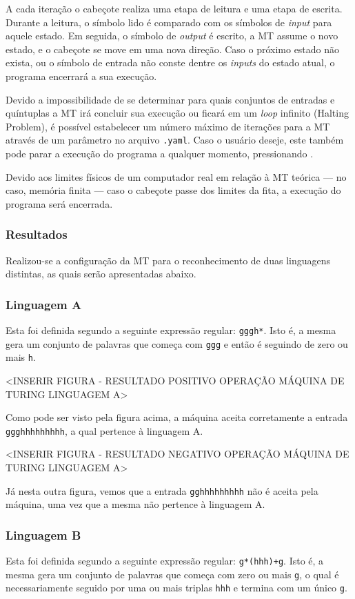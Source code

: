 \documentclass[12pt,fleqn]{article}
\begin{document}
A cada iteração o cabeçote realiza uma etapa de leitura e uma etapa de escrita.
Durante a leitura, o símbolo lido é comparado com os símbolos de \textit{input}
para aquele estado. Em seguida, o símbolo de \textit{output} é escrito, a MT
assume o novo estado, e o cabeçote se move em uma nova direção. Caso o próximo
estado não exista, ou o símbolo de entrada não conste dentre os \textit{inputs}
do estado atual, o programa encerrará a sua execução.

Devido a impossibilidade de se determinar para quais conjuntos de entradas e
quíntuplas a MT irá concluir sua execução ou ficará em um \textit{loop} infinito
(Halting Problem), é possível estabelecer um número máximo de iterações para a
MT através de um parâmetro no arquivo \verb|.yaml|. Caso o usuário deseje, este
também pode parar a execução do programa a qualquer momento, pressionando
.

Devido aos limites físicos de um computador real em relação à MT teórica --- no
caso, memória finita --- caso o cabeçote passe dos limites da fita, a execução
do programa será encerrada.

\subsubsection{Resultados}
Realizou-se a configuração da MT para o reconhecimento de duas linguagens
distintas, as quais serão apresentadas abaixo.

\subsubsection{Linguagem A}
Esta foi definida segundo a seguinte expressão regular: \verb|gggh*|.
Isto é, a mesma gera um conjunto de palavras que começa com \verb|ggg| e então é
seguindo de zero ou mais \verb|h|.

<INSERIR FIGURA - RESULTADO POSITIVO OPERAÇÃO MÁQUINA DE TURING LINGUAGEM A>

Como pode ser visto pela figura acima, a máquina aceita corretamente a entrada
\verb|ggghhhhhhhhh|, a qual pertence à linguagem A.

<INSERIR FIGURA - RESULTADO NEGATIVO OPERAÇÃO MÁQUINA DE TURING LINGUAGEM A>

Já nesta outra figura, vemos que a entrada \verb|gghhhhhhhhh| não é aceita pela
máquina, uma vez que a mesma não pertence à linguagem A.

\subsubsection{Linguagem B}
Esta foi definida segundo a seguinte expressão regular:
\verb|g*(hhh)+g|. Isto é, a mesma gera um conjunto de palavras que começa com
zero ou mais \verb|g|, o qual é necessariamente seguido por uma ou mais triplas
\verb|hhh| e termina com um único \verb|g|.
\end{document}
